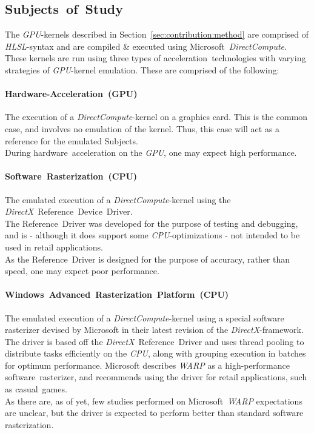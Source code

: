 \documentclass[fleqn,10pt]{SelfArx} %
\begin{document}
\subsection{Subjects~of~Study}
\label{sec:contribution:Subjectofstudy}
The \textit{GPU}-kernels described in Section~\ref{sec:contribution:method} are comprised of \textit{HLSL}-syntax and are compiled \& executed using Microsoft~\textit{DirectCompute}. These kernels are run using three types of acceleration~technologies with varying strategies of \textit{GPU}-kernel emulation. These are comprised of the following:
\paragraph{Hardware-Acceleration~(GPU)}
	The execution of a \textit{DirectCompute}-kernel on a graphics card. This is the common case, and involves no emulation of the kernel. Thus, this case will act as a reference for the emulated Subjects.\\
	During hardware~acceleration on the \textit{GPU}, one may expect high performance.
\paragraph{Software~Rasterization~(CPU)}
	The emulated execution of a \textit{DirectCompute}-kernel using the \textit{DirectX}~Reference~Device~Driver.\\
The Reference~Driver was developed for the purpose of testing and debugging, and is - although it does support some \textit{CPU}-optimizations - not intended to be used in retail applications.\\
	As the Reference~Driver is designed for the purpose of accuracy, rather than speed, one may expect poor performance.
\paragraph{Windows~Advanced~Rasterization~Platform~(CPU)}
	The emulated execution of a \textit{DirectCompute}-kernel using a special software rasterizer devised by Microsoft in their latest revision of the \textit{DirectX}-framework.\\
	The driver is based off the \textit{DirectX}~Reference~Driver and uses thread pooling to distribute tasks efficiently on the \textit{CPU}, along with grouping execution in batches for optimum performance. Microsoft describes \textit{WARP} as a high-performance software~rasterizer, and recommends using the driver for retail applications, such as casual~games.\\
As there are, as of yet, few studies performed on Microsoft~\textit{WARP} expectations are unclear, but the driver is expected to perform better than standard software rasterization.\\
\end{document}
